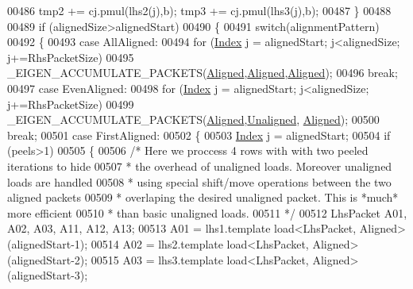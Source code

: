 \begin{DoxyCode}
{{00486         tmp2 += cj.pmul(lhs2(j),b); tmp3 += cj.pmul(lhs3(j),b);
00487       \}
00488 
00489       \textcolor{keywordflow}{if} (alignedSize>alignedStart)
00490       \{
00491         \textcolor{keywordflow}{switch}(alignmentPattern)
00492         \{
00493           \textcolor{keywordflow}{case} AllAligned:
00494             \textcolor{keywordflow}{for} (\hyperlink{namespace_eigen_a62e77e0933482dafde8fe197d9a2cfde}{Index} j = alignedStart; j<alignedSize; j+=RhsPacketSize)
00495               \_EIGEN\_ACCUMULATE\_PACKETS(\hyperlink{group__enums_gga45fe06e29902b7a2773de05ba27b47a1ad37d4c71425bb286e9b4103830538fbf}{Aligned},\hyperlink{group__enums_gga45fe06e29902b7a2773de05ba27b47a1ad37d4c71425bb286e9b4103830538fbf}{Aligned},\hyperlink{group__enums_gga45fe06e29902b7a2773de05ba27b47a1ad37d4c71425bb286e9b4103830538fbf}{Aligned});
00496             \textcolor{keywordflow}{break};
00497           \textcolor{keywordflow}{case} EvenAligned:
00498             \textcolor{keywordflow}{for} (\hyperlink{namespace_eigen_a62e77e0933482dafde8fe197d9a2cfde}{Index} j = alignedStart; j<alignedSize; j+=RhsPacketSize)
00499               \_EIGEN\_ACCUMULATE\_PACKETS(\hyperlink{group__enums_gga45fe06e29902b7a2773de05ba27b47a1ad37d4c71425bb286e9b4103830538fbf}{Aligned},\hyperlink{group__enums_gga45fe06e29902b7a2773de05ba27b47a1ac935220b4c844108e183ebe30a4d5204}{Unaligned},
      \hyperlink{group__enums_gga45fe06e29902b7a2773de05ba27b47a1ad37d4c71425bb286e9b4103830538fbf}{Aligned});
00500             \textcolor{keywordflow}{break};
00501           \textcolor{keywordflow}{case} FirstAligned:
00502           \{
00503             \hyperlink{namespace_eigen_a62e77e0933482dafde8fe197d9a2cfde}{Index} j = alignedStart;
00504             \textcolor{keywordflow}{if} (peels>1)
00505             \{
00506               \textcolor{comment}{/* Here we proccess 4 rows with with two peeled iterations to hide}
00507 \textcolor{comment}{               * the overhead of unaligned loads. Moreover unaligned loads are handled}
00508 \textcolor{comment}{               * using special shift/move operations between the two aligned packets}
00509 \textcolor{comment}{               * overlaping the desired unaligned packet. This is *much* more efficient}
00510 \textcolor{comment}{               * than basic unaligned loads.}
00511 \textcolor{comment}{               */}
00512               LhsPacket A01, A02, A03, A11, A12, A13;
00513               A01 = lhs1.template load<LhsPacket, Aligned>(alignedStart-1);
00514               A02 = lhs2.template load<LhsPacket, Aligned>(alignedStart-2);
00515               A03 = lhs3.template load<LhsPacket, Aligned>(alignedStart-3);
}}
\end{DoxyCode}
